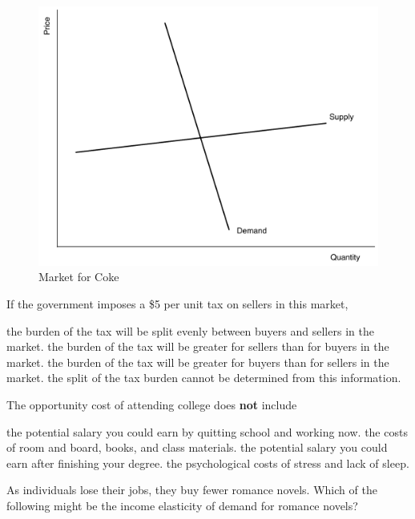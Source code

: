 \documentclass[addpoints,11pt]{exam}
\theoremstyle{definition}
\begin{document}
\begin{questions}
	\begin{figure}[H]
		\centering
		\includegraphics[scale=.40]{Exam1_MC19.pdf}
		\caption{Market for Coke}
		\label{MC19}
	\end{figure}
	
	If the government imposes a \$5 per unit tax on sellers in this market,  
	
	\begin{choices}
		\choice the burden of the tax will be split evenly between buyers and sellers in the market.
		\choice the burden of the tax will be greater for sellers than for buyers in the market.
		\CorrectChoice the burden of the tax will be greater for buyers than for sellers in the market.
		\choice the split of the tax burden cannot be determined from this information. 
	\end{choices}
	
\newpage
	
	\question The opportunity cost of attending college does \textbf{not} include
	
	\begin{choices}
		\choice the potential salary you could earn by quitting school and working now.
		\choice the costs of room and board, books, and class materials.
		\CorrectChoice the potential salary you could earn after finishing your degree.
		\choice the psychological costs of stress and lack of sleep.
	\end{choices}

	
	\question As individuals lose their jobs, they buy fewer romance novels. Which of the following might be the income elasticity of demand for romance novels?
	

\end{questions}
\end{document}
